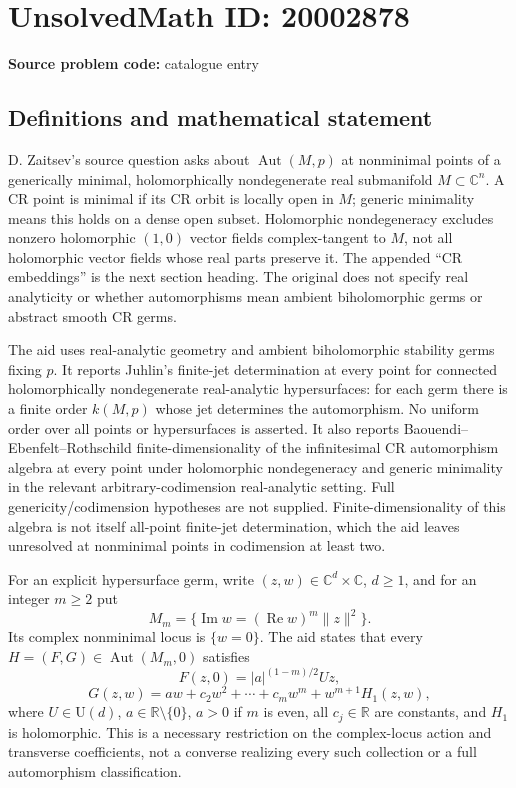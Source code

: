 \documentclass[11pt]{article}
\newcommand{\R}{\mathbb{R}}
\newcommand{\C}{\mathbb{C}}
\begin{document}
\section*{UnsolvedMath ID: 20002878}
\textbf{Source problem code:} catalogue entry
\subsection{Definitions and mathematical statement}
D. Zaitsev's source question asks about $\operatorname{Aut}(M,p)$ at nonminimal points of a generically minimal, holomorphically nondegenerate real submanifold $M\subset\C^n$. A CR point is minimal if its CR orbit is locally open in $M$; generic minimality means this holds on a dense open subset. Holomorphic nondegeneracy excludes nonzero holomorphic $(1,0)$ vector fields complex-tangent to $M$, not all holomorphic vector fields whose real parts preserve it. The appended ``CR embeddings'' is the next section heading. The original does not specify real analyticity or whether automorphisms mean ambient biholomorphic germs or abstract smooth CR germs.

The aid uses real-analytic geometry and ambient biholomorphic stability germs fixing $p$. It reports Juhlin's finite-jet determination at every point for connected holomorphically nondegenerate real-analytic hypersurfaces: for each germ there is a finite order $k(M,p)$ whose jet determines the automorphism. No uniform order over all points or hypersurfaces is asserted. It also reports Baouendi--Ebenfelt--Rothschild finite-dimensionality of the infinitesimal CR automorphism algebra at every point under holomorphic nondegeneracy and generic minimality in the relevant arbitrary-codimension real-analytic setting. Full genericity/codimension hypotheses are not supplied. Finite-dimensionality of this algebra is not itself all-point finite-jet determination, which the aid leaves unresolved at nonminimal points in codimension at least two.

For an explicit hypersurface germ, write $(z,w)\in\C^d\times\C$, $d\ge1$, and for an integer $m\ge2$ put
\[
 M_m=\{\operatorname{Im}w=(\operatorname{Re}w)^m\|z\|^2\}.
\]
Its complex nonminimal locus is $\{w=0\}$. The aid states that every $H=(F,G)\in\operatorname{Aut}(M_m,0)$ satisfies
\[
 F(z,0)=|a|^{(1-m)/2}Uz,
\]
\[
 G(z,w)=aw+c_2w^2+\cdots+c_mw^m+w^{m+1}H_1(z,w),
\]
where $U\in\mathrm U(d)$, $a\in\R\setminus\{0\}$, $a>0$ if $m$ is even, all $c_j\in\R$ are constants, and $H_1$ is holomorphic. This is a necessary restriction on the complex-locus action and transverse coefficients, not a converse realizing every such collection or a full automorphism classification.
\end{document}
